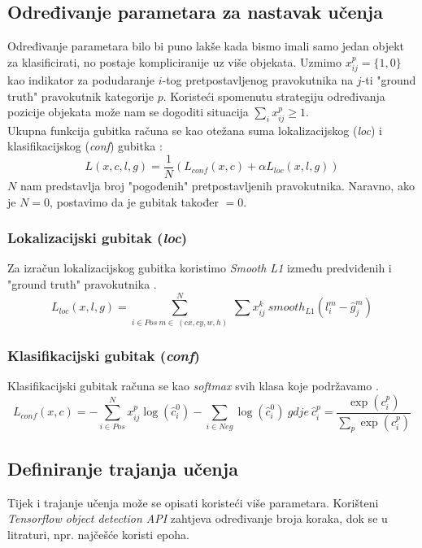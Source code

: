 \subsection{Određivanje parametara za nastavak učenja}
Određivanje parametara bilo bi puno lakše kada bismo imali samo jedan objekt za klasificirati, no postaje kompliciranije uz više objekata.
Uzmimo $x^p_{ij}=\{1,0\}$ kao indikator za podudaranje $i$-tog pretpostavljenog pravokutnika na $j$-ti "ground truth" pravokutnik kategorije $p$.
Koristeći spomenutu strategiju određivanja pozicije objekata može nam se dogoditi situacija $\sum_i{x_{ij}^p} \geq 1$. \\
Ukupna funkcija gubitka računa se kao otežana suma lokalizacijskog (\emph{loc}) i klasifikacijskog (\emph{conf}) gubitka \cite{liu2016ssd}:
\begin{equation}
	\label{eq:lokKlasLoss}
	L(x,c,l,g)=\frac{1}{N}(L_{conf}(x,c)+\alpha L_{loc}(x,l,g))
\end{equation}
$N$ nam predstavlja broj "pogođenih" pretpostavljenih pravokutnika. Naravno, ako je $N=0$, postavimo da je gubitak također $=0$.
\subsubsection{Lokalizacijski gubitak (\emph{loc})}
Za izračun lokalizacijskog gubitka koristimo \emph{Smooth L1} između predviđenih i "ground truth" pravokutnika \cite{liu2016ssd}.
\begin{equation}
	\label{eq:lokLoss}
	L_{loc}(x,l,g)=\sum_{i\in Pos\ m \in\ (cx, cy, w, h)}^{N} \ \sum x_{ij}^k\ smooth_{L1}(l_i^m - \hat g_j^m)
\end{equation}
\subsubsection{Klasifikacijski gubitak (\emph{conf})}
Klasifikacijski gubitak računa se kao \emph{softmax} svih klasa koje podržavamo \cite{liu2016ssd}.
\begin{equation}
	\label{eq:klasLoss}
	L_{conf}(x,c)=-\sum_{i \in Pos}^N x_{ij}^p \log(\hat c_i^0) - \sum_{i \in Neg} \log(\hat c_i^0 ) \ {gdje} \ \hat c_i^p=\frac{\exp(c_i^p)}{\sum_p \exp(c_i^p)}
\end{equation}
\subsection{Definiranje trajanja učenja}
Tijek i trajanje učenja može se opisati koristeći više parametara. 
Korišteni \emph{Tensorflow object detection API} zahtjeva određivanje broja koraka, dok se u litraturi, npr. \cite{chollet2017deep}  najčešće koristi epoha.
